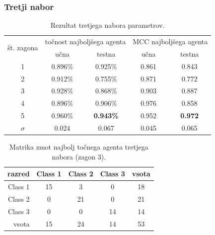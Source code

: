 \subsubsection{Tretji nabor}
\begin{table}[H]
    \caption{Rezultat tretjega nabora parametrov.}
    \begin{center}
        \begin{tabular}{|| c | c c || c c ||}
            \hline
            \multirow{2}{*}{št. zagona} & \multicolumn{2}{c||}{točnost najboljšega agenta} & \multicolumn{2}{c||}{MCC najboljšega agenta} \\ \cline{2-5}
            & učna    & testna           & učna  & testna         \\
            \hline
            1        & 0.896\% & 0.925\%          & 0.861 & 0.843          \\
            \hline
            2        & 0.912\% & 0.755\%          & 0.871 & 0.772          \\
            \hline
            3        & 0.928\% & 0.868\%          & 0.903 & 0.887          \\
            \hline
            4        & 0.896\% & 0.906\%          & 0.976 & 0.858          \\
            \hline
            5        & 0.960\% & \textbf{0.943\%} & 0.952 & \textbf{0.972} \\
            \hline
            $\sigma$ & 0.024   & 0.067            & 0.045 & 0.065          \\
            \hline
        \end{tabular}
    \end{center}
    \label{tab:wine_result_3}
\end{table}

\begin{table}[H]
    \centering
    \caption{Matrika zmot najbolj točnega agenta tretjega nabora (zagon 3).}
    \begin{tabular}{||rcccc||}
        \hline
        razred  & Class 1 & Class 2 & Class 3 & vsota \\ \hline
        Class 1 & 15      & 3       & 0       & 18    \\ \hline
        Class 2 & 0       & 21      & 0       & 21    \\ \hline
        Class 3 & 0       & 0       & 14      & 14    \\ \hline
        vsota   & 15      & 24      & 14      & 53    \\ \hline
    \end{tabular}
    \label{tab:wine_acc_3}
\end{table}

